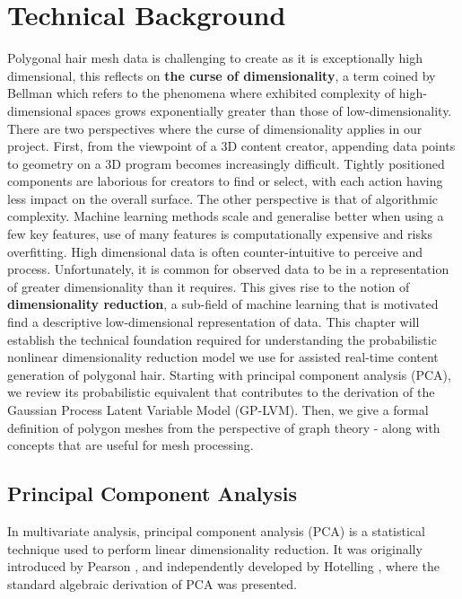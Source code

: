\documentclass[ %
author={Dillon Keith Diep},
supervisor={Dr. Carl Henrik Ek},
degree={MEng},
title={ART-CG Hair:},
subtitle={Assisted Real-time Content Generation of Stylised Virtual Hair},
type={Research},
year={2017} ]{dissertation}
\begin{document}

\chapter{Technical Background}
\label{chap:technical}
Polygonal hair mesh data is challenging to create as it is exceptionally high dimensional, this reflects on \textbf{the curse of dimensionality}, a term coined by Bellman \cite{curseofdim} which refers to the phenomena where exhibited complexity of high-dimensional spaces grows exponentially greater than those of low-dimensionality. There are two perspectives where the curse of dimensionality applies in our project. First, from the viewpoint of a 3D content creator, appending data points to geometry on a 3D program becomes increasingly difficult. Tightly positioned components are laborious for creators to find or select, with each action having less impact on the overall surface. The other perspective is that of algorithmic complexity. Machine learning methods scale and generalise better when using a few key features, use of many features is computationally expensive and risks overfitting. High dimensional data is often counter-intuitive to perceive and process. Unfortunately, it is common for observed data to be in a representation of greater dimensionality than it requires. This gives rise to the notion of \textbf{dimensionality reduction}, a sub-field of machine learning that is motivated find a descriptive low-dimensional representation of data.
This chapter will establish the technical foundation required for understanding the probabilistic nonlinear dimensionality reduction model we use for assisted real-time content generation of polygonal hair. Starting with principal component analysis (PCA), we review its probabilistic equivalent that contributes to the derivation of the Gaussian Process Latent Variable Model (GP-LVM). Then, we give a formal definition of polygon meshes from the perspective of graph theory - along with concepts that are useful for mesh processing.

\section{Principal Component Analysis}
In multivariate analysis, principal component analysis (PCA) is a statistical technique used to perform linear dimensionality reduction. It was originally introduced by Pearson \cite{pca1901}, and independently developed by Hotelling \cite{pca1933}, where the standard algebraic derivation of PCA was presented.
\end{document}

